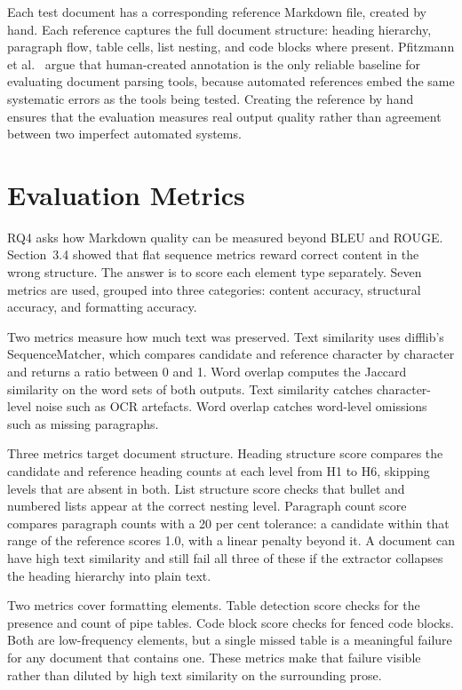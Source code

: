 Each test document has a corresponding reference Markdown file, created by
hand. Each reference captures the full document structure: heading hierarchy,
paragraph flow, table cells, list nesting, and code blocks where present.
Pfitzmann et al.\ \autocite{pfitzmann2022} argue that human-created annotation is
the only reliable baseline for evaluating document parsing tools, because
automated references embed the same systematic errors as the tools being
tested. Creating the reference by hand ensures that the evaluation measures
real output quality rather than agreement between two imperfect automated
systems.

\section{Evaluation Metrics}
\label{sec:eval_metrics}

RQ4 asks how Markdown quality can be measured beyond BLEU and ROUGE.
Section~3.4 showed that flat sequence metrics reward correct content in
the wrong structure. The answer is to score each element type separately.
Seven metrics are used, grouped into three categories: content accuracy,
structural accuracy, and formatting accuracy.

Two metrics measure how much text was preserved. Text similarity uses
difflib's SequenceMatcher, which compares candidate and reference character
by character and returns a ratio between 0 and 1. Word overlap computes
the Jaccard similarity on the word sets of both outputs. Text similarity
catches character-level noise such as OCR artefacts. Word overlap catches
word-level omissions such as missing paragraphs.

Three metrics target document structure. Heading structure score compares
the candidate and reference heading counts at each level from H1 to H6,
skipping levels that are absent in both. List structure score checks that
bullet and numbered lists appear at the correct nesting level. Paragraph
count score compares paragraph counts with a 20 per cent tolerance: a
candidate within that range of the reference scores 1.0, with a linear
penalty beyond it. A document can have high text similarity and still fail
all three of these if the extractor collapses the heading hierarchy into
plain text.

Two metrics cover formatting elements. Table detection score checks for the
presence and count of pipe tables. Code block score checks for fenced code
blocks. Both are low-frequency elements, but a single missed table is a
meaningful failure for any document that contains one. These metrics make
that failure visible rather than diluted by high text similarity on the
surrounding prose.


